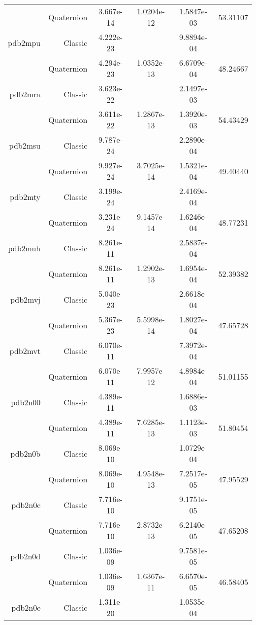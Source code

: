 \begin{xltabular}{\textwidth}{r|rS[table-format=1.3e+2]S[table-format=1.4e+2]S[table-format=1.4e+2]S[table-format=-1.5]}
& Quaternion & 3.667e-14 & 1.0204e-12 & 1.5847e-03 & 53.31107\\  \addlinespace
pdb2mpu & Classic & 4.222e-23 &  & 9.8894e-04 & \\
& Quaternion & 4.294e-23 & 1.0352e-13 & 6.6709e-04 & 48.24667\\  \addlinespace
pdb2mra & Classic & 3.623e-22 &  & 2.1497e-03 & \\
& Quaternion & 3.611e-22 & 1.2867e-13 & 1.3920e-03 & 54.43429\\  \addlinespace
pdb2msu & Classic & 9.787e-24 &  & 2.2890e-04 & \\
& Quaternion & 9.927e-24 & 3.7025e-14 & 1.5321e-04 & 49.40440\\  \addlinespace
pdb2mty & Classic & 3.199e-24 &  & 2.4169e-04 & \\
& Quaternion & 3.231e-24 & 9.1457e-14 & 1.6246e-04 & 48.77231\\  \addlinespace
pdb2muh & Classic & 8.261e-11 &  & 2.5837e-04 & \\
& Quaternion & 8.261e-11 & 1.2902e-13 & 1.6954e-04 & 52.39382\\  \addlinespace
pdb2mvj & Classic & 5.040e-23 &  & 2.6618e-04 & \\
& Quaternion & 5.367e-23 & 5.5998e-14 & 1.8027e-04 & 47.65728\\  \addlinespace
pdb2mvt & Classic & 6.070e-11 &  & 7.3972e-04 & \\
& Quaternion & 6.070e-11 & 7.9957e-12 & 4.8984e-04 & 51.01155\\  \addlinespace
pdb2n00 & Classic & 4.389e-11 &  & 1.6886e-03 & \\
& Quaternion & 4.389e-11 & 7.6285e-13 & 1.1123e-03 & 51.80454\\  \addlinespace
pdb2n0b & Classic & 8.069e-10 &  & 1.0729e-04 & \\
& Quaternion & 8.069e-10 & 4.9548e-13 & 7.2517e-05 & 47.95529\\  \addlinespace
pdb2n0c & Classic & 7.716e-10 &  & 9.1751e-05 & \\
& Quaternion & 7.716e-10 & 2.8732e-13 & 6.2140e-05 & 47.65208\\  \addlinespace
pdb2n0d & Classic & 1.036e-09 &  & 9.7581e-05 & \\
& Quaternion & 1.036e-09 & 1.6367e-11 & 6.6570e-05 & 46.58405\\  \addlinespace
pdb2n0e & Classic & 1.311e-20 &  & 1.0535e-04 & \\

\end{xltabular}
